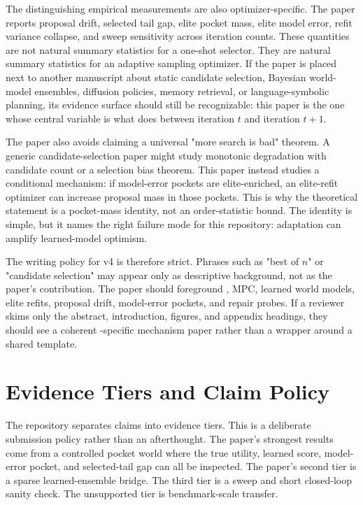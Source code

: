 The distinguishing empirical measurements are also optimizer-specific. The
paper reports proposal drift, selected tail gap, elite pocket mass, elite model
error, refit variance collapse, and sweep sensitivity across iteration counts.
These quantities are not natural summary statistics for a one-shot selector.
They are natural summary statistics for an adaptive sampling optimizer. If the
paper is placed next to another manuscript about static candidate selection,
Bayesian world-model ensembles, diffusion policies, memory retrieval, or
language-symbolic planning, its evidence surface should still be recognizable:
this paper is the one whose central variable is what \cem{} does between
iteration $t$ and iteration $t+1$.

The paper also avoids claiming a universal "more search is bad" theorem. A
generic candidate-selection paper might study monotonic degradation with
candidate count or a selection bias theorem. This paper instead studies a
conditional mechanism: if model-error pockets are elite-enriched, an
elite-refit optimizer can increase proposal mass in those pockets. This is why
the theoretical statement is a pocket-mass identity, not an order-statistic
bound. The identity is simple, but it names the right failure mode for this
repository: adaptation can amplify learned-model optimism.

The writing policy for v4 is therefore strict. Phrases such as "best of $n$"
or "candidate selection" may appear only as descriptive background, not as the
paper's contribution. The paper should foreground \cem{}, MPC, learned world
models, elite refits, proposal drift, model-error pockets, and repair probes.
If a reviewer skims only the abstract, introduction, figures, and appendix
headings, they should see a coherent \cem{}-specific mechanism paper rather
than a wrapper around a shared template.

\section{Evidence Tiers and Claim Policy}
\label{app:evidence-tiers}

The repository separates claims into evidence tiers. This is a deliberate
submission policy rather than an afterthought. The paper's strongest results
come from a controlled pocket world where the true utility, learned score,
model-error pocket, and selected-tail gap can all be inspected. The paper's
second tier is a sparse learned-ensemble bridge. The third tier is a sweep and
short closed-loop sanity check. The unsupported tier is benchmark-scale
transfer.

